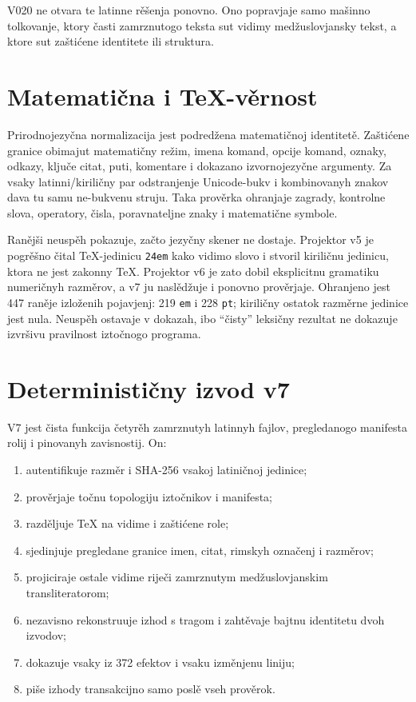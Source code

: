 \documentclass[11pt]{article}
\newcommand{\code}[1]{\texttt{#1}}
\begin{document}
V020 ne otvara te latinne rěšenja ponovno. Ono popravjaje samo mašinno tolkovanje, ktory časti zamrznutogo teksta sut vidimy medžuslovjansky tekst, a ktore sut zaštićene identitete ili struktura.

\section{Matematična i TeX-věrnost}

Prirodnojezyčna normalizacija jest podredžena matematičnoj identitetě. Zaštićene granice obimajut matematičny režim, imena komand, opcije komand, oznaky, odkazy, ključe citat, puti, komentare i dokazano izvornojezyčne argumenty. Za vsaky latinni/kiriličny par odstranjenje Unicode-bukv i kombinovanyh znakov dava tu samu ne-bukvenu struju. Taka prověrka ohranjaje zagrady, kontrolne slova, operatory, čisla, poravnateljne znaky i matematične symbole.

Ranějši neuspěh pokazuje, začto jezyčny skener ne dostaje. Projektor v5 je pogrěšno čital TeX-jedinicu \code{24em} kako vidimo slovo i stvoril kiriličnu jedinicu, ktora ne jest zakonny TeX. Projektor v6 je zato dobil eksplicitnu gramatiku numeričnyh razměrov, a v7 ju naslědžuje i ponovno prověrjaje. Ohranjeno jest 447 raněje izloženih pojavjenj: 219 \code{em} i 228 \code{pt}; kiriličny ostatok razměrne jedinice jest nula. Neuspěh ostavaje v dokazah, ibo ``čisty'' leksičny rezultat ne dokazuje izvršivu pravilnost iztočnogo programa.

\section{Determinističny izvod v7}

V7 jest čista funkcija četyrěh zamrznutyh latinnyh fajlov, pregledanogo manifesta rolij i pinovanyh zavisnostij. On:

\begin{enumerate}
\item autentifikuje razměr i SHA-256 vsakoj latiničnoj jedinice;
\item prověrjaje točnu topologiju iztočnikov i manifesta;
\item razděljuje TeX na vidime i zaštićene role;
\item sjedinjuje pregledane granice imen, citat, rimskyh označenj i razměrov;
\item projiciraje ostale vidime riječi zamrznutym medžuslovjanskim transliteratorom;
\item nezavisno rekonstruuje izhod s tragom i zahtěvaje bajtnu identitetu dvoh izvodov;
\item dokazuje vsaky iz 372 efektov i vsaku izměnjenu liniju;
\item piše izhody transakcijno samo poslě vseh prověrok.
\end{enumerate}
\end{document}
